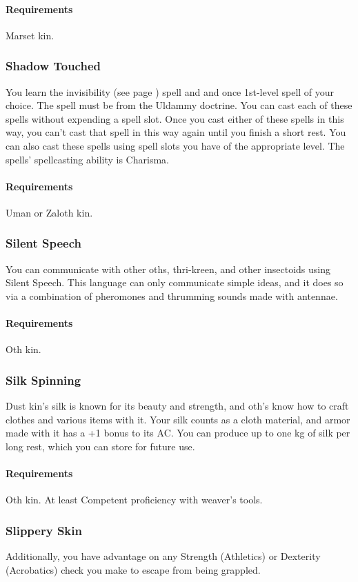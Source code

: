    \paragraph{Requirements} Marset kin.
\subsubsection{Shadow Touched} \label{feat::shadowtouched}
    You learn the invisibility (see page \pageref{spell::invisibility}) spell and and once 1st-level spell of your choice.
    The spell must be from the Uldammy doctrine.
    You can cast each of these spells without expending a spell slot.
    Once you cast either of these spells in this way, you can't cast that spell in this way again until you finish a short rest.
    You can also cast these spells using spell slots you have of the appropriate level.
    The spells' spellcasting ability is Charisma.
    \paragraph{Requirements} Uman or Zaloth kin.
\subsubsection{Silent Speech} \label{feat::silentspeech}
    You can communicate with other oths, thri-kreen, and other insectoids using Silent Speech.
    This language can only communicate simple ideas, and it does so via a combination of pheromones and thrumming sounds made with antennae.
    \paragraph{Requirements} Oth kin.
\subsubsection{Silk Spinning} \label{feat::silkspinning}
    Dust kin's silk is known for its beauty and strength, and oth's know how to craft clothes and various items with it.
    Your silk counts as a cloth material, and armor made with it has a +1 bonus to its AC.
    You can produce up to one kg of silk per long rest, which you can store for future use.
    \paragraph{Requirements} Oth kin. At least Competent proficiency with weaver's tools.
\subsubsection{Slippery Skin} \label{feat::slipperyskin}
    Additionally, you have advantage on any Strength (Athletics) or Dexterity (Acrobatics) check you make to escape from being grappled.

